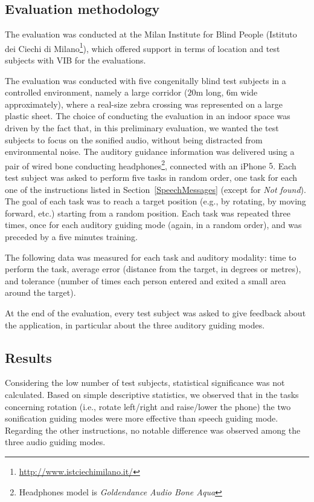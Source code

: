 \documentclass{article}
\begin{document}
\subsection{Evaluation methodology}
\label{sub:prelimMethod}
The evaluation was conducted at the Milan Institute for Blind People (Istituto dei Ciechi di Milano\footnote{\url{http://www.istciechimilano.it/}}), which offered support in terms of location and test subjects with VIB for the evaluations.

The evaluation was conducted with five congenitally blind test subjects in a controlled environment, namely a large corridor ($20$m long, $6$m wide approximately), where a real-size zebra crossing was represented on a large plastic sheet.
The choice of conducting the evaluation in an indoor space was driven by the fact that, in this preliminary evaluation, we wanted the test subjects to focus on the sonified audio, without being distracted from environmental noise.
The auditory guidance information was delivered using a pair of wired bone conducting headphones\footnote{Headphones model is \emph{Goldendance Audio Bone Aqua}}, connected with an iPhone $5$.
Each test subject was asked to perform five tasks in random order, one task for each one of the instructions listed in Section~\ref{SpeechMessages} (except for \emph{Not found}).
The goal of each task was to reach a target position (e.g., by rotating, by moving forward, etc.) starting from a random position.
Each task was repeated three times, once for each auditory guiding mode (again, in a random order), and was preceded by a five minutes training.

The following data was measured for each task and auditory modality: time to perform the task, average error (distance from the target, in degrees or metres), and tolerance (number of times each person entered and exited a small area around the target).

At the end of the evaluation, every test subject was asked to give feedback about the application, in particular about the three auditory guiding modes.

\subsection{Results}
\label{PrelRes}

Considering the low number of test subjects, statistical significance was not calculated. Based on simple descriptive statistics, we observed that in the tasks concerning rotation (i.e., rotate left/right and raise/lower the phone) the two sonification guiding modes were more effective than speech guiding mode.
Regarding the other instructions, no notable difference was observed among the three audio guiding modes.
\end{document}
